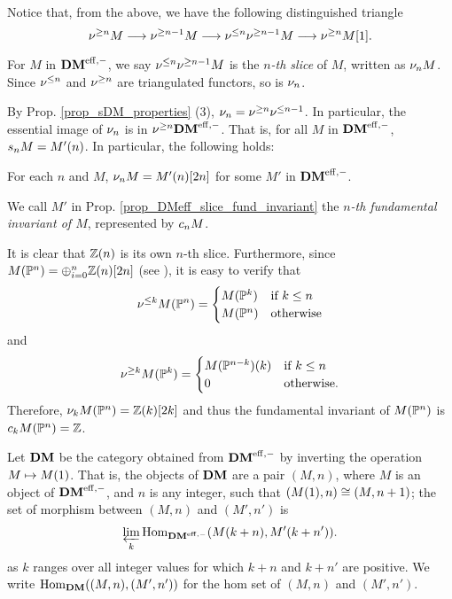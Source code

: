 Notice that, from the above, we have the following distinguished
triangle
\begin{equation}
\sgDM{n} M \to \sgDM{n - 1} M \to \slDM{n} \sgDM{n - 1} M
\to \sgDM{n} M[1].
\end{equation}

\begin{defn}
For $M$ in $\DMeff$, we say $\slDM{n}\sgDM{n - 1}M$ is the 
\emph{$n$-th slice} of $M$, written as $\sliceDM{n}M$. Since
$\slDM{n}$ and $\sgDM{n}$ are triangulated functors, so is 
$\sliceDM{n}$.
\end{defn}

By Prop. \ref{prop_sDM_properties} (3), $\sliceDM{n} =
\sgDM{n}\slDM{n - 1}$. In particular, the essential image of
$\sliceDM{n}$ is in $\sgDM{n}\DMeff$. That is, for all $M$ in 
$\DMeff$, $\slice{n}M = \tZ[n]{M'}$. In particular, the following
holds:

\begin{prop}\label{prop_DMeff_slice_fund_invariant}
For each $n$ and $M$, $\sliceDM{n}M = M'(n)[2n]$ for some $M'$ in
$\DMeff$.
\end{prop}

\begin{defn}\label{def_fI_DMeff}
We call $M'$ in Prop. \ref{prop_DMeff_slice_fund_invariant} the 
\emph{$n$-th fundamental invariant of $M$}, represented by
$\fIDM{n}M$.
\end{defn}

\begin{ex}\label{ex_sfilt_MPn}
It is clear that $\Z(n)$ is its own $n$-th slice. Furthermore,
since $M(\P^n) = \oplus_{i = 0}^n \Z(n)[2n]$ (see 
\cite[Corollary 15.5]{MVW}), it is easy to verify that 
\[
\slDM{k}M(\P^n) = \begin{cases}
M(\P^k) & \textrm{if }k \leq n \\
M(\P^n) & \textrm{otherwise}
\end{cases}
\]
and 
\[
\sgDM{k}M(\P^k) = \begin{cases}
\tZ[k]{M(\P^{n - k})} & \textrm{if }k \leq n\\
0 & \textrm{otherwise}.
\end{cases}
\]
Therefore, $\sliceDM{k} M(\P^n) = \Z(k)[2k]$ and thus the 
fundamental invariant of $M(\P^n)$ is $\fIDM{k}M(\P^n) = \Z$.
\end{ex}

\begin{defn}
Let $\DM$ be the category obtained from $\DMeff$ by inverting
the operation $M \mapsto \tZ{M}$. That is, the objects of $\DM$
are a pair $(M, n)$, where $M$ is an object of $\DMeff$, and $n$
is any integer, such that $(\tZ{M}, n) \cong (M, n + 1)$; the set 
of morphism between $(M, n)$ and $(M', n')$ is 
\[
\varprojlim_{k} \homDMf(\tZ[k + n]{M}, \tZ[k + n']{M'}).
\]
as $k$ ranges over all integer values for which $k + n$ and 
$k + n'$ are positive. We write $\homDM((M, n), (M',n'))$ for the 
hom set of $(M, n)$ and $(M', n')$. 
\end{defn}

